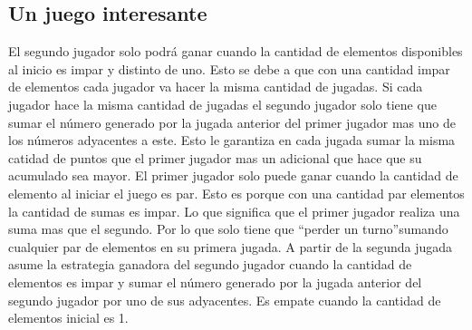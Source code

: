\subsection{Un juego interesante} El segundo jugador solo podrá ganar cuando la cantidad de elementos disponibles al inicio es impar y distinto de uno. Esto se debe a que con una cantidad impar de elementos cada jugador va hacer la misma cantidad de jugadas. Si cada jugador hace la misma cantidad de jugadas el segundo jugador solo tiene que sumar el número generado por la jugada anterior del primer jugador mas uno de los números adyacentes a este. Esto le garantiza en cada jugada sumar la misma catidad de puntos que el primer jugador mas un adicional que hace que su acumulado sea mayor. El primer jugador solo puede ganar cuando la cantidad de elemento al iniciar el juego es par. Esto es porque con una cantidad par elementos la cantidad de sumas es impar. Lo que significa que el primer jugador realiza una suma mas que el segundo. Por lo que solo tiene que \textquotedblleft perder un turno\textquotedblright sumando cualquier par de elementos en su primera jugada. A partir de la segunda jugada asume la estrategia ganadora del segundo jugador cuando la cantidad de elementos es impar y sumar el número generado por la jugada anterior del segundo jugador  por uno de sus adyacentes. Es empate cuando la cantidad de elementos inicial es 1.